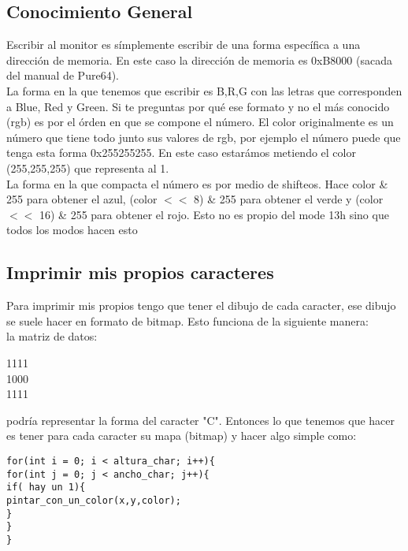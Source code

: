 \documentclass[]{article}
\begin{document}
\subsection*{Conocimiento General}

Escribir al monitor es s\'implemente escribir de una forma espec\'ifica a una direcci\'on de memoria. En este caso la direcci\'on de memoria es 0xB8000 (sacada del manual de Pure64).\\

La forma en la que tenemos que escribir es B,R,G con las letras que corresponden a Blue, Red y Green. Si te preguntas por qu\'e ese formato y no el m\'as conocido (rgb) es por el \'orden en que se compone el n\'umero. El color originalmente es un n\'umero que tiene todo junto sus valores de rgb, por ejemplo el n\'umero puede que tenga esta forma 0x255255255. En este caso estar\'amos metiendo el color (255,255,255) que representa al 1.\\

La forma en la que compacta el n\'umero es por medio de shifteos. Hace color \& 255 para obtener el azul, (color $<<$ 8) \& 255 para obtener el verde y (color $<<$ 16) \& 255 para obtener el rojo. Esto no es propio del mode 13h sino que todos los modos hacen esto

\subsection*{Imprimir mis propios caracteres}
Para imprimir mis propios tengo que tener el dibujo de cada caracter, ese dibujo se suele hacer en formato de bitmap. Esto funciona de la siguiente manera: \\

la matriz de datos:\\
\begin{center}
1111\\
1000\\
1111\\
\end{center}

podría representar la forma del caracter "C". Entonces lo que tenemos que hacer es tener para cada caracter su mapa (bitmap) y hacer algo simple como:

\begin{verbatim}
for(int i = 0; i < altura_char; i++){
for(int j = 0; j < ancho_char; j++){
if( hay un 1){
pintar_con_un_color(x,y,color);
}
}
}
\end{verbatim}
\end{document}

